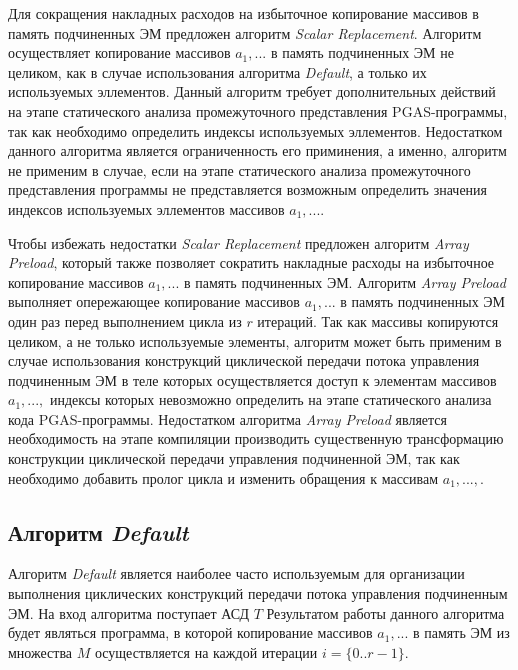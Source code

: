 Для сокращения накладных расходов на избыточное копирование массивов в память
подчиненных ЭМ предложен алгоритм \textit{Scalar Replacement}. Алгоритм
осуществляет копирование массивов $a_{1},...$ в память подчиненных ЭМ
не целиком, как в случае использования алгоритма \textit{Default}, а только
их используемых эллементов. Данный алгоритм требует дополнительных действий на
этапе статического анализа промежуточного представления PGAS-программы, так как
необходимо определить индексы используемых эллементов. Недостатком данного
алгоритма является ограниченность его приминения, а именно, алгоритм не применим
в случае, если на этапе статического анализа промежуточного представления
программы не представляется возможным определить значения индексов используемых
эллементов массивов $a_{1},...$.

Чтобы избежать недостатки \textit{Scalar Replacement} предложен алгоритм
\textit{Array Preload}, который также позволяет сократить накладные расходы
на избыточное копирование массивов $a_{1},...$ в память подчиненных ЭМ. Алгоритм
\textit{Array Preload} выполняет опережающее копирование массивов $a_{1},...$
в память подчиненных ЭМ один раз перед выполнением цикла из $r$ итераций.
Так как массивы копируются целиком, а не только используемые элементы,
алгоритм может быть применим в случае использования конструкций циклической
передачи потока управления подчиненным ЭМ в теле которых осуществляется доступ к
элементам массивов $a_{1},...,$ индексы которых невозможно определить на этапе
статического анализа кода PGAS-программы. Недостатком алгоритма
\textit{Array Preload} является необходимость на этапе компиляции производить
существенную трансформацию конструкции циклической передачи управления
подчиненной ЭМ, так как необходимо добавить пролог цикла и изменить обращения
к массивам $a_{1},...,$.


\subsection{Алгоритм \textit{Default}}

Алгоритм \textit{Default} является наиболее часто используемым для организации
выполнения циклических конструкций передачи потока управления подчиненным ЭМ.
На вход алгоритма поступает АСД $T$
Результатом работы данного алгоритма будет являться программа, в которой
копирование массивов $a_{1},...$ в память ЭМ из множества $M$ осуществляется на
каждой итерации $i=\{0..r-1\}$.

